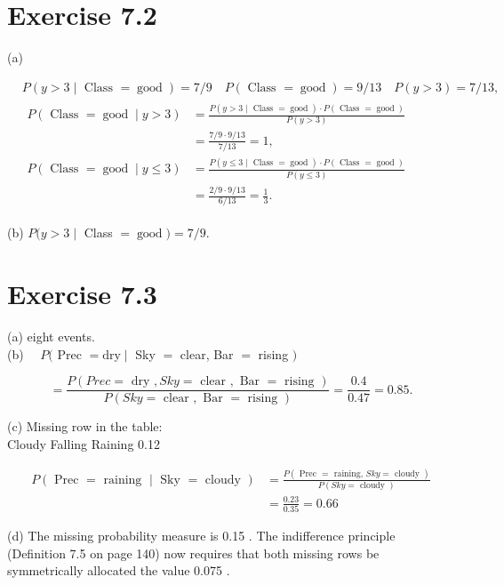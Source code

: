 \documentclass[10pt]{article}
\begin{document}
\section*{Exercise 7.2}
(a)

$$
\begin{aligned}
& P(y>3 \mid \text { Class }=\operatorname{good})=7 / 9 \quad P(\text { Class }=\operatorname{good})=9 / 13 \quad P(y>3)=7 / 13, \\
& \begin{aligned}
P(\text { Class }=\operatorname{good} \mid y>3) & =\frac{P(y>3 \mid \text { Class }=\operatorname{good}) \cdot P(\text { Class }=\operatorname{good})}{P(y>3)} \\
& =\frac{7 / 9 \cdot 9 / 13}{7 / 13}=1, \\
P(\text { Class }=\operatorname{good} \mid y \leq 3) & =\frac{P(y \leq 3 \mid \text { Class }=\operatorname{good}) \cdot P(\text { Class }=\operatorname{good})}{P(y \leq 3)} \\
& =\frac{2 / 9 \cdot 9 / 13}{6 / 13}=\frac{1}{3} .
\end{aligned}
\end{aligned}
$$

(b) $P(y>3 \mid$ Class $=\operatorname{good})=7 / 9$.

\section*{Exercise 7.3}
(a) eight events.\\
(b) $\quad P($ Prec $=\mathrm{dry} \mid$ Sky $=$ clear, Bar $=$ rising $)$

$$
=\frac{P(P r e c=\text { dry }, S k y=\text { clear }, \text { Bar }=\text { rising })}{P(S k y=\text { clear }, \text { Bar }=\text { rising })}=\frac{0.4}{0.47}=0.85 .
$$

(c) Missing row in the table:\\
Cloudy Falling Raining 0.12

$$
\begin{aligned}
P(\text { Prec }=\text { raining } \mid \text { Sky }=\text { cloudy }) & =\frac{P(\text { Prec }=\text { raining, } S k y=\text { cloudy })}{P(S k y=\text { cloudy })} \\
& =\frac{0.23}{0.35}=0.66
\end{aligned}
$$

(d) The missing probability measure is 0.15 . The indifference principle (Definition 7.5 on page 140) now requires that both missing rows be symmetrically allocated the value 0.075 .
\end{document}
